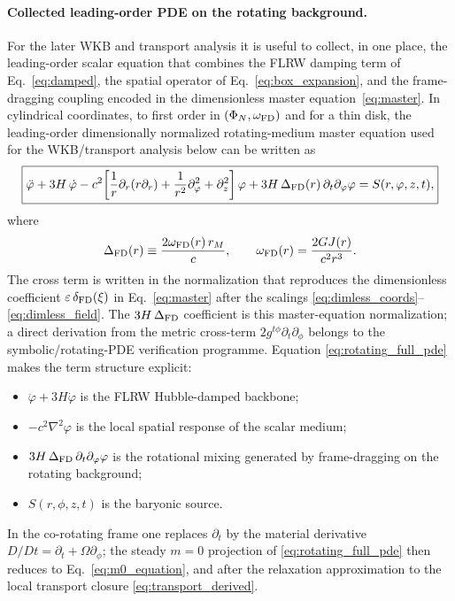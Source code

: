 \documentclass[11pt]{article}
\begin{document}
\paragraph{Collected leading-order PDE on the rotating background.}
For the later WKB and transport analysis it is useful to collect, in one
place, the leading-order scalar equation that combines the FLRW damping
term of Eq.~\eqref{eq:damped}, the spatial operator of
Eq.~\eqref{eq:box_expansion}, and the frame-dragging coupling encoded in
the dimensionless master equation~\eqref{eq:master}.  In cylindrical
coordinates, to first order in $(\Phi_N,\omega_{\rm FD})$ and for a thin
disk, the leading-order dimensionally normalized rotating-medium master
equation used for the WKB/transport analysis below can be written as
\begin{equation}
\boxed{
\ddot{\varphi}
+ 3H\,\dot{\varphi}
- c^2\!\left[
\frac{1}{r}\partial_r(r\partial_r)
+ \frac{1}{r^2}\partial_\phi^2
+ \partial_z^2
\right]\varphi
+ 3H\,\Delta_{\rm FD}(r)\,\partial_t\partial_\phi\varphi
= S(r,\phi,z,t),
}
\label{eq:rotating_full_pde}
\end{equation}
where
\begin{equation}
\Delta_{\rm FD}(r)\equiv \frac{2\omega_{\rm FD}(r)\,r_M}{c},
\qquad
\omega_{\rm FD}(r)=\frac{2GJ(r)}{c^2r^3}.
\label{eq:Delta_FD_dimensional}
\end{equation}
The cross term is written in the normalization that reproduces the
dimensionless coefficient $\varepsilon\,\delta_{\rm FD}(\xi)$ in
Eq.~\eqref{eq:master} after the scalings
\eqref{eq:dimless_coords}--\eqref{eq:dimless_field}.  The
$3H\,\Delta_{\rm FD}$ coefficient is this master-equation normalization;
a direct derivation from the metric cross-term
$2g^{t\phi}\partial_t\partial_\phi$ belongs to the
symbolic/rotating-PDE verification programme.  Equation
\eqref{eq:rotating_full_pde} makes the term structure explicit:
\begin{itemize}
\item $\ddot{\varphi}+3H\dot{\varphi}$ is the FLRW Hubble-damped backbone;
\item $-c^2\nabla^2\varphi$ is the local spatial response of the scalar medium;
\item $3H\,\Delta_{\rm FD}\,\partial_t\partial_\phi\varphi$ is the rotational
  mixing generated by frame-dragging on the rotating background;
\item $S(r,\phi,z,t)$ is the baryonic source.
\end{itemize}
In the co-rotating frame one replaces $\partial_t$ by the material
derivative $D/Dt=\partial_t+\Omega\partial_\phi$; the steady $m=0$
projection of \eqref{eq:rotating_full_pde} then reduces to
Eq.~\eqref{eq:m0_equation}, and after the relaxation approximation to the
local transport closure \eqref{eq:transport_derived}.
\end{document}

